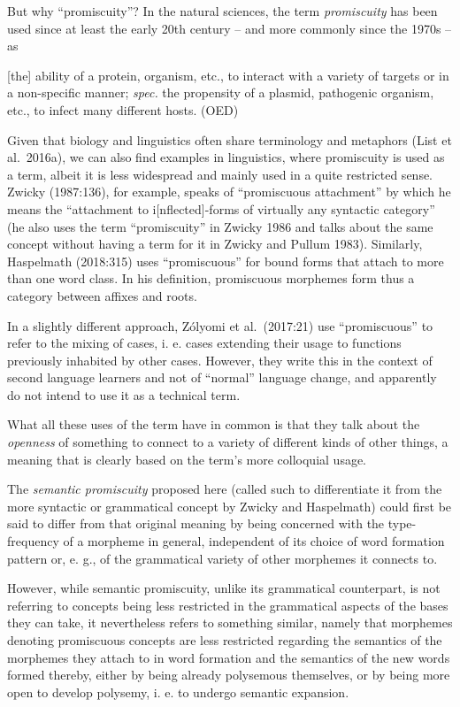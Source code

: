\documentclass[
  english,
  a4paper,
  oneside,tablecaptionabove
]{scrbook}
\begin{document}
But why \enquote{promiscuity}? In the natural sciences, the term
\emph{promiscuity} has been used since at least the early 20th century
-- and more commonly since the 1970s -- as

\begin{displayquote}
{[}the{]} ability of a protein, organism, etc., to interact with a
variety of targets or in a non-specific manner; \emph{spec.} the
propensity of a plasmid, pathogenic organism, etc., to infect many
different hosts. (OED)
\end{displayquote}

Given that biology and linguistics often share terminology and metaphors
(List et al.~2016a), we can also find examples in linguistics, where
promiscuity is used as a term, albeit it is less widespread and mainly
used in a quite restricted sense. Zwicky (1987:136), for example, speaks
of \enquote{promiscuous attachment} by which he means the
\enquote{attachment to i{[}nflected{]}-forms of virtually any syntactic
category} (he also uses the term \enquote{promiscuity} in Zwicky 1986
and talks about the same concept without having a term for it in Zwicky
and Pullum 1983). Similarly, Haspelmath (2018:315) uses
\enquote{promiscuous} for bound forms that attach to more than one word
class. In his definition, promiscuous morphemes form thus a category
between affixes and roots.

In a slightly different approach, Zólyomi et al.~(2017:21) use
\enquote{promiscuous} to refer to the mixing of cases, i. e. cases
extending their usage to functions previously inhabited by other cases.
However, they write this in the context of second language learners and
not of \enquote{normal} language change, and apparently do not intend to
use it as a technical term.

What all these uses of the term have in common is that they talk about
the \emph{openness} of something to connect to a variety of different
kinds of other things, a meaning that is clearly based on the term's
more colloquial usage.

The \emph{semantic promiscuity} proposed here (called such to
differentiate it from the more syntactic or grammatical concept by
Zwicky and Haspelmath) could first be said to differ from that original
meaning by being concerned with the type-frequency of a morpheme in
general, independent of its choice of word formation pattern or, e. g.,
of the grammatical variety of other morphemes it connects to.

However, while semantic promiscuity, unlike its grammatical counterpart,
is not referring to concepts being less restricted in the grammatical
aspects of the bases they can take, it nevertheless refers to something
similar, namely that morphemes denoting promiscuous concepts are less
restricted regarding the semantics of the morphemes they attach to in
word formation and the semantics of the new words formed thereby, either
by being already polysemous themselves, or by being more open to develop
polysemy, i. e. to undergo semantic expansion.
\end{document}
